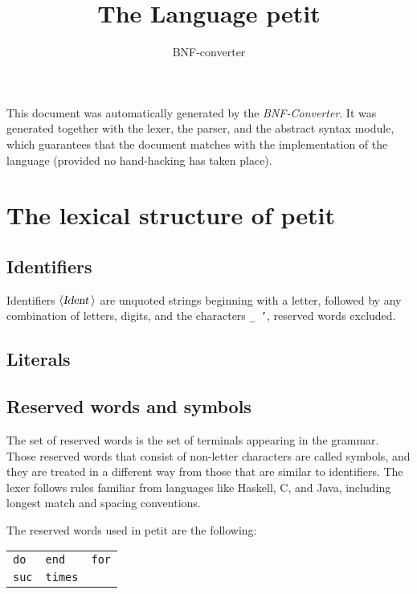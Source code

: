 \documentclass[a4paper,11pt]{article}
\author{BNF-converter}
\title{The Language petit}
\begin{document}
\maketitle

\newcommand{\emptyP}{\mbox{$\epsilon$}}
\newcommand{\terminal}[1]{\mbox{{\texttt {#1}}}}
\newcommand{\nonterminal}[1]{\mbox{$\langle \mbox{{\sl #1 }} \! \rangle$}}
\newcommand{\arrow}{\mbox{::=}}
\newcommand{\delimit}{\mbox{$|$}}
\newcommand{\reserved}[1]{\mbox{{\texttt {#1}}}}
\newcommand{\literal}[1]{\mbox{{\texttt {#1}}}}
\newcommand{\symb}[1]{\mbox{{\texttt {#1}}}}

This document was automatically generated by the {\em BNF-Converter}. It was generated together with the lexer, the parser, and the abstract syntax module, which guarantees that the document matches with the implementation of the language (provided no hand-hacking has taken place).

\section*{The lexical structure of petit}
\subsection*{Identifiers}
Identifiers \nonterminal{Ident} are unquoted strings beginning with a letter,
followed by any combination of letters, digits, and the characters {\tt \_ '},
reserved words excluded.


\subsection*{Literals}


\subsection*{Reserved words and symbols}
The set of reserved words is the set of terminals appearing in the grammar. Those reserved words that consist of non-letter characters are called symbols, and they are treated in a different way from those that are similar to identifiers. The lexer follows rules familiar from languages like Haskell, C, and Java, including longest match and spacing conventions.

The reserved words used in petit are the following: \\

\begin{tabular}{lll}
{\reserved{do}} &{\reserved{end}} &{\reserved{for}} \\
{\reserved{suc}} &{\reserved{times}} & \\
\end{tabular}\\
\end{document}
